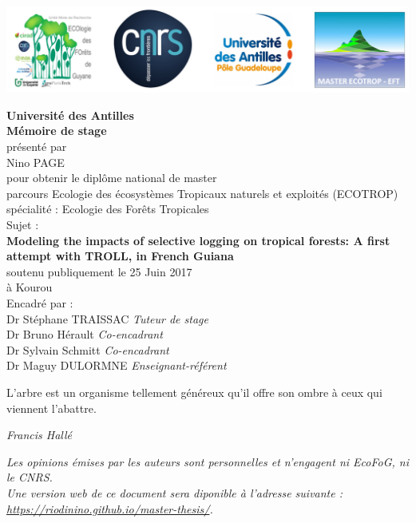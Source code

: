 \documentclass[12pt,]{article}
\theoremstyle{definition}
\theoremstyle{definition}
\theoremstyle{definition}
\theoremstyle{remark}
\begin{document}
  \includegraphics{images/logos}
  
  \begin{center}
  \Large{\textbf{Université des Antilles}} \\
    \LARGE{\textbf{Mémoire de stage}} \\
    \vspace*{\fill}
    \large{présenté par} \\
    \large{Nino PAGE} \\
    \vspace*{\fill}
    \large{pour obtenir le diplôme national de master} \\
    \large{parcours Ecologie des écosystèmes Tropicaux naturels et exploités (ECOTROP)} \\
    \small{spécialité : Ecologie des Forêts Tropicales} \\
    \vspace*{\fill}
    \large{Sujet :} \\
    \Large{\textbf{Modeling the impacts of selective logging on tropical forests: A first attempt with TROLL, in French Guiana}} \\
    \vspace*{\fill}
    \large{soutenu publiquement le 25 Juin 2017} \\
    \large{à Kourou} \\
    \vspace*{\fill}
    \large{Encadré par :} \\
    \vspace*{\fill}
    Dr Stéphane TRAISSAC  \emph{Tuteur de stage} \\
    Dr Bruno Hérault  \emph{Co-encadrant} \\
    Dr Sylvain Schmitt  \emph{Co-encadrant} \\
    Dr Maguy DULORMNE  \emph{Enseignant-référent} \\
  \end{center}
  
  \newpage
  \vspace*{\fill}
  \epigraph{L\textquoteright arbre est un organisme tellement généreux qu’il offre son ombre à ceux qui viennent l\textquoteright abattre.}{\textit{Francis Hallé}}
  \vspace*{\fill}
  \emph{Les opinions émises par les auteurs sont personnelles et n'engagent ni EcoFoG, ni le CNRS.}\\
  \emph{Une version web de ce document sera diponible à l'adresse suivante : \url{https://riodinino.github.io/master-thesis/}.}
  \newpage
\end{document}
